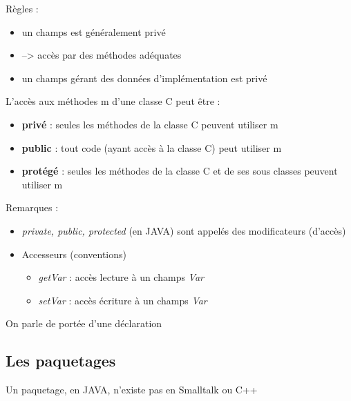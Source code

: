 \documentclass{article}
\begin{document}
Règles :
\begin{itemize}
	\item un champs est généralement privé
	\item --> accès par des méthodes adéquates
	\item un champs gérant des données d'implémentation est privé
\end{itemize}

L'accès aux méthodes m d'une classe C peut être :
\begin{itemize}
	\item \textbf{privé} : seules les méthodes de la classe C peuvent utiliser m
	\item \textbf{public} : tout code (ayant accès à la classe C) peut utiliser m
	\item \textbf{protégé} : seules les méthodes de la classe C et de ses sous classes
		peuvent utiliser m 
\end{itemize}

Remarques :
\begin{itemize}
	\item \emph{private, public, protected} (en JAVA) sont appelés des
modificateurs (d'accès)
	\item Accesseurs (conventions)
	\begin{itemize}
		\item \emph{getVar} : accès lecture à un champs \emph{Var}
		\item \emph{setVar} : accès écriture à un champs \emph{Var}
	\end{itemize}
\end{itemize}

On parle de portée d'une déclaration

\subsection{Les paquetages}

Un paquetage, en JAVA, n'existe pas en Smalltalk ou C++
\end{document}
